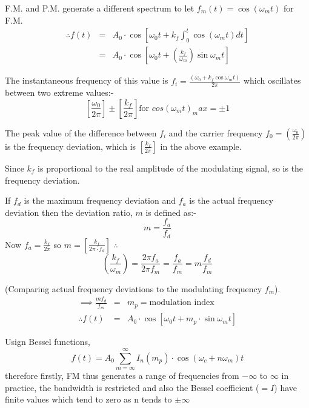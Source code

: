 \documentclass[11pt]{article} %
\begin{document}
F.M. and P.M. generate a different spectrum to let $f_m(t) = \cos{\left(\omega_mt\right)}$ for F.M.
\begin{eqnarray}
\therefore f(t) &=& A_0 \cdot \cos{\left[\omega_0t + k_f\int^t_0\cos{\left(\omega_mt\right)}dt\right]} \nonumber \\
&=& A_0\cdot\cos{\left[\omega_0t+\left( \frac{k_f}{\omega_m}\right)\sin{\omega_mt }\right]}
\end{eqnarray}

The instantaneous frequency of this value is $f_i = \frac{(\omega_0 +k_f\cos{\omega_mt})}{2\pi}$ which oscillates between two extreme values:-
\begin{equation}
\left[ \frac{\omega_0}{2\pi} \right] \pm \left[ \frac{k_f}{2\pi} \right] \mbox{for } cos(\omega_mt)_max=\pm 1
\end{equation}

The peak value of the difference between $f_i$ and the carrier frequency $f_0 = \left( \frac{\omega_0}{2\pi}\right)$ is the frequency deviation, which is $\left[ \frac{k_f}{2\pi}\right]$ in the above example.

Since $k_f$ is proportional to the real amplitude of the modulating signal, so is the frequency deviation.

If $f_d$ is the maximum frequency deviation and $f_a$ is the actual frequency deviation then the deviation ratio, $m$ is defined as:-
\begin{equation}
m=\frac{f_a}{f_d}
\end{equation}
Now $f_a = \frac{k_f}{2\pi}$ so $m=\left[\frac{k_f}{2\pi\cdot f_d}\right]$
$\therefore$ 
\begin{equation}
\left(\frac{k_f}{\omega_m}\right) = \frac{2\pi f_a}{2\pi f_m} = \frac{f_a}{f_m} = m\frac{f_d}{f_m}
\end{equation}

(Comparing actual frequency deviations to the modulating frequency $f_m$).
\begin{eqnarray}
\implies \frac{mf_d}{f_m} &=& m_p = \mbox{modulation index} \nonumber \\
\therefore f(t) &=& A_0 \cdot\cos{\left[\omega_0t+m_p\cdot\sin{\omega_mt}\right]}
\end{eqnarray}

Usign Bessel functions, 
\begin{equation}
	f(t) = A_0 \sum_{m=\infty}^{\infty}{I_n(m_p)\cdot \cos{(\omega_c + n\omega_m)}t}
\end{equation}
therefore firstly, FM thus generates a range of frequencies from $-\infty$ to $\infty$ in practice, the bandwidth is restricted and also the Bessel coefficient ($=I$) have finite values which tend to zero as n tends to $\pm \infty$
\end{document}
